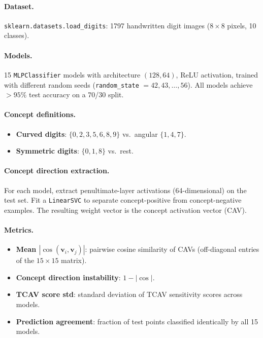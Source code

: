 \documentclass[11pt,a4paper]{article}
\begin{document}
\paragraph{Dataset.}
\texttt{sklearn.datasets.load\_digits}: 1797 handwritten digit images
($8 \times 8$ pixels, 10 classes).

\paragraph{Models.}
15 \texttt{MLPClassifier} models with architecture $(128, 64)$, ReLU
activation, trained with different random seeds (\texttt{random\_state}
$= 42, 43, \ldots, 56$).  All models achieve $>95\%$ test accuracy on
a 70/30 split.

\paragraph{Concept definitions.}
\begin{itemize}[nosep]
  \item \textbf{Curved digits}: $\{0, 2, 3, 5, 6, 8, 9\}$ vs.\ angular
    $\{1, 4, 7\}$.
  \item \textbf{Symmetric digits}: $\{0, 1, 8\}$ vs.\ rest.
\end{itemize}

\paragraph{Concept direction extraction.}
For each model, extract penultimate-layer activations (64-dimensional) on
the test set.  Fit a \texttt{LinearSVC} to separate concept-positive from
concept-negative examples.  The resulting weight vector is the concept
activation vector (CAV).

\paragraph{Metrics.}
\begin{itemize}[nosep]
  \item \textbf{Mean $|\cos(\mathbf{v}_i, \mathbf{v}_j)|$}: pairwise cosine
    similarity of CAVs (off-diagonal entries of the $15 \times 15$ matrix).
  \item \textbf{Concept direction instability}: $1 - |\cos|$.
  \item \textbf{TCAV score std}: standard deviation of TCAV sensitivity scores
    across models.
  \item \textbf{Prediction agreement}: fraction of test points classified
    identically by all 15 models.
\end{itemize}
\end{document}

